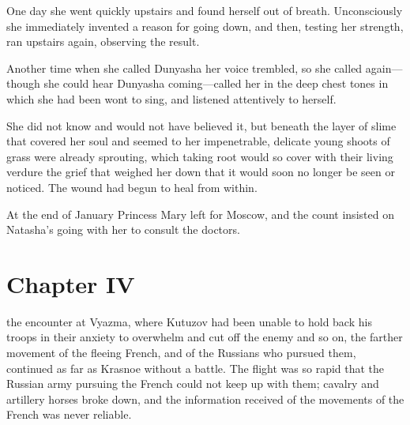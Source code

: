One day she went quickly upstairs and found herself out of
breath.  Unconsciously she immediately invented a reason for
going down, and then, testing her strength, ran upstairs again,
observing the result.

Another time when she called Dunyasha her voice trembled, so she
called again---though she could hear Dunyasha coming---called her
in the deep chest tones in which she had been wont to sing, and
listened attentively to herself.

She did not know and would not have believed it, but beneath the
layer of slime that covered her soul and seemed to her
impenetrable, delicate young shoots of grass were already
sprouting, which taking root would so cover with their living
verdure the grief that weighed her down that it would soon no
longer be seen or noticed. The wound had begun to heal from
within.

At the end of January Princess Mary left for Moscow, and the
count insisted on Natasha's going with her to consult the
doctors.


\chapter*{Chapter IV}
\ifaudio 
{}
\fi

 the encounter at Vyazma, where Kutuzov had been unable to
hold back his troops in their anxiety to overwhelm and cut off
the enemy and so on, the farther movement of the fleeing French,
and of the Russians who pursued them, continued as far as Krasnoe
without a battle. The flight was so rapid that the Russian army
pursuing the French could not keep up with them; cavalry and
artillery horses broke down, and the information received of the
movements of the French was never reliable.

